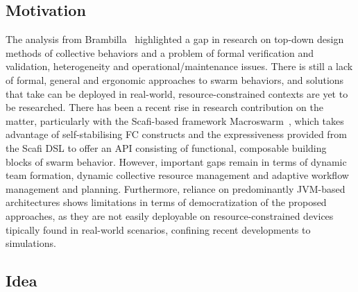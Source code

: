 \documentclass[12pt]{article}
\begin{document}
\subsection{Motivation}
The analysis from Brambilla~\cite{brambilla2013swarm} highlighted a gap in research on top-down design methods of collective behaviors and a problem of
formal verification and validation, heterogeneity and operational/maintenance issues. There is still a lack of formal, general and ergonomic approaches to swarm behaviors,
and solutions that take can be deployed in real-world, resource-constrained contexts are yet to be researched. There has been a recent rise in research contribution on the matter, 
particularly with the Scafi-based framework Macroswarm~\cite{aguzzi2023macroswarm}, which takes advantage of self-stabilising FC constructs and the expressiveness provided from the
Scafi DSL to offer an API consisting of functional, composable building blocks of swarm behavior.
However, important gaps remain in terms of dynamic team formation, dynamic collective resource management and adaptive workflow management and planning.
Furthermore, reliance on predominantly JVM-based architectures shows limitations in terms of democratization of the proposed approaches, as they are not easily deployable on resource-constrained devices tipically
found in real-world scenarios, confining recent developments to simulations.

\subsection{Idea}
\end{document}
